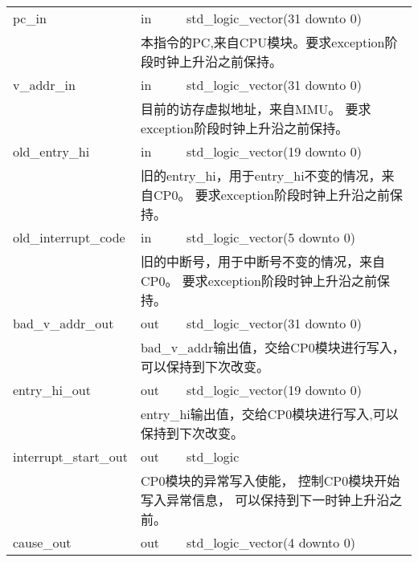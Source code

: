 \begin{tabularx}{\textwidth}{lll}
            \midrule
            pc\_in          & in        & std\_logic\_vector(31 downto 0) \\
            \cmidrule(l){2-3}
            &
            \multicolumn{2}{X}{
                本指令的PC,来自CPU模块。要求exception阶段时钟上升沿之前保持。
            } \\
            \midrule
            v\_addr\_in     & in        & std\_logic\_vector(31 downto 0) \\
            \cmidrule(l){2-3}
            &
            \multicolumn{2}{X}{
                目前的访存虚拟地址，来自MMU。%
                要求exception阶段时钟上升沿之前保持。
            } \\
            \midrule
	        old\_entry\_hi  & in        & std\_logic\_vector(19 downto 0) \\
            \cmidrule(l){2-3}
            &
            \multicolumn{2}{X}{
                旧的entry\_hi，用于entry\_hi不变的情况，来自CP0。%
                要求exception阶段时钟上升沿之前保持。
            } \\
            \midrule
            old\_interrupt\_code & in   & std\_logic\_vector(5 downto 0) \\
            \cmidrule(l){2-3}
            &
            \multicolumn{2}{X}{
                旧的中断号，用于中断号不变的情况，来自CP0。%
                要求exception阶段时钟上升沿之前保持。
            } \\
            \midrule
            bad\_v\_addr\_out & out     & std\_logic\_vector(31 downto 0) \\
            \cmidrule(l){2-3}
            &
            \multicolumn{2}{X}{
                bad\_v\_addr输出值，交给CP0模块进行写入，可以保持到下次改变。
            } \\
            \midrule
            entry\_hi\_out  & out       & std\_logic\_vector(19 downto 0) \\
            \cmidrule(l){2-3}
            &
            \multicolumn{2}{X}{
                entry\_hi输出值，交给CP0模块进行写入,可以保持到下次改变。
            } \\
            \midrule
	        interrupt\_start\_out & out & std\_logic \\
            \cmidrule(l){2-3}
            &
            \multicolumn{2}{X}{
                CP0模块的异常写入使能，%
                控制CP0模块开始写入异常信息，%
                可以保持到下一时钟上升沿之前。
            } \\
            \midrule
	        cause\_out      & out       & std\_logic\_vector(4 downto 0) \\

\end{tabularx}
